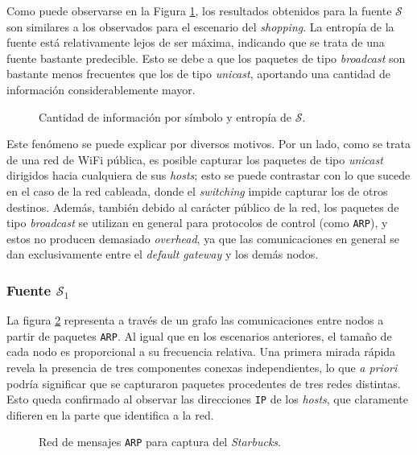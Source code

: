 Como puede observarse en la Figura \ref{res:esc3:s}, los resultados
obtenidos para la fuente $\mathcal{S}$ son similares a los observados para el
escenario del \emph{shopping}. La entropía de la fuente está relativamente
lejos de ser máxima, indicando que se trata de una fuente bastante predecible.
Esto se debe a que los paquetes de tipo \emph{broadcast} son bastante menos
frecuentes que los de tipo \emph{unicast}, aportando una cantidad de
información considerablemente mayor.

\begin{figure}[H]
    \caption{Cantidad de información por símbolo y entropía de $\mathcal{S}$.}
    \label{res:esc3:s}
\end{figure}

Este fenómeno se puede explicar por diversos motivos. Por un lado, como se
trata de una red de WiFi pública, es posible capturar los paquetes de tipo
\emph{unicast} dirigidos hacia cualquiera de sus \emph{hosts}; esto se puede
contrastar con lo que sucede en el caso de la red cableada, donde el
\emph{switching} impide capturar los de otros destinos. Además, también debido
al carácter público de la red, los paquetes de tipo
\emph{broadcast} se utilizan en general para protocolos de control (como
\texttt{ARP}), y estos no producen demasiado \emph{overhead}, ya que las
comunicaciones en general se dan exclusivamente entre el \emph{default gateway}
y los demás nodos.

\subsubsection{Fuente $\mathcal{S}_1$}

La figura \ref{res:esc3:graph} representa a través de un grafo las
comunicaciones entre nodos a partir de paquetes \texttt{ARP}. Al igual que
en los escenarios anteriores, el tamaño de cada nodo es proporcional a su
frecuencia relativa. Una primera mirada rápida revela la presencia de tres
componentes conexas independientes, lo que \emph{a priori} podría significar
que se capturaron paquetes procedentes de tres redes distintas. Esto queda
confirmado al observar las direcciones \texttt{IP} de los \emph{hosts}, que
claramente difieren en la parte que identifica a la red.

\begin{figure}[H]
    \caption{Red de mensajes \texttt{ARP} para captura del \emph{Starbucks}.}
    \label{res:esc3:graph}
\end{figure}

